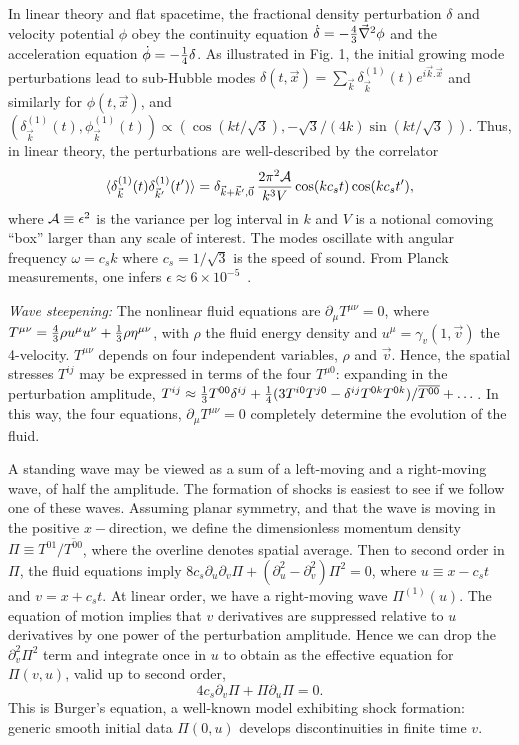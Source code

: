 \documentclass[prl,aps,10pt,twocolumn,showkeys,nofootinbib]{revtex4-1}
\def\ben{\begin{equation}}
\def\een{\end{equation}}
\def\be{\begin{equation}}
\def\ee{\end{equation}}
\begin{document}
In linear theory and flat spacetime, the fractional density perturbation $\delta$ and velocity potential $\phi$ obey the continuity equation $\dot{\delta}=-{4\over 3} \vec{\nabla}^2 \phi$ and the acceleration equation $\dot{\phi}=-{1\over 4} \delta$. As illustrated in Fig. 1, the initial growing mode perturbations lead to sub-Hubble modes $\delta(t,\vec{x})=\sum_{\vec{k}} \delta^{(1)}_{\vec{k}} (t) e^{i\vec{k}.\vec{x}}$  and similarly for $\phi(t,\vec{x})$, and $ ( \delta^{(1)}_{\vec{k}} (t) ,  \phi^{(1)}_{\vec{k}} (t) )\propto \left(\cos (k t/\sqrt{3}),-\sqrt{3}/(4 k)\sin (k t/\sqrt{3})\right).$ Thus, in linear theory, the perturbations are well-described by the correlator
\ben
\langle\delta^{(1)}_{\vec{k}}(t)\delta^{(1)}_{\vec{k}'}(t') \rangle=\delta_{\vec{k}+\vec{k}',\vec{0}}\,{2 \pi^2{ \cal A}\over k^3 V} \cos(k c_s t) \cos(k c_s t'),
\label{eq1}
\een
where ${\cal A}\equiv \epsilon^2$ is the variance per log interval in $k$ and $V$ is a notional comoving ``box'' larger than any scale of interest. The modes oscillate with angular frequency $\omega=c_s k$ where $c_s=1/\sqrt{3}$ is the speed of sound. From Planck measurements, one infers $\epsilon\approx 6\times 10^{-5}$~\cite{foottilt}.

{\it Wave steepening:} 
The nonlinear fluid equations are $\partial_\mu T^{\mu \nu}=0$, where $T^{\mu \nu}={4\over 3} \rho u^\mu u^\nu +{1\over 3} \rho \eta^{\mu \nu}$, with $\rho$ the fluid energy density and $u^\mu=\gamma_{v}(1,\vec{v})$ the 4-velocity.  $T^{\mu \nu}$ depends on four independent variables, $\rho$ and $\vec{v}$. Hence, the spatial stresses $T^{ij}$ may be expressed in terms of the four $T^{\mu 0}$: expanding in the perturbation amplitude, $T^{ij}\approx {1\over 3} T^{00}\delta^{ij} +{1\over 4} (3T^{i 0}T^{j 0}-\delta^{ij} T^{0k} T^{0k})/\overline{T^{00}}+\dots$. In this way, the four equations, $\partial_\mu T^{\mu \nu}=0$ completely determine the evolution of the fluid. 

A standing wave may be viewed as a sum of a left-moving and a right-moving wave, of half the amplitude. The formation of shocks is easiest to see if we follow one of these waves. Assuming planar symmetry, and that the wave is  moving in the positive $x-$direction, we define the dimensionless momentum density $\Pi\equiv T^{01}/\overline{T^{00}}$, where the overline denotes spatial average. Then to second order in $\Pi$, the fluid equations imply $8 c_s \partial_u \partial_v \Pi +(\partial_u^2-\partial_v^2)\Pi^2=0$, where $u\equiv x-c_s t$ and $v=x+c_s t$. At linear order, we have a right-moving wave $\Pi^{(1)}(u)$. The equation of motion implies that $v$ derivatives are suppressed relative to $u$ derivatives by one power of the perturbation amplitude. Hence we can drop the $\partial_v^2\Pi^2$ term and integrate once in $u$ to obtain as the effective equation for $\Pi(v,u)$, valid up to second order,
\be
4 c_s
\partial_v \Pi + \Pi \partial_u \Pi=0.
\label{eq2}
\ee
This is Burger's equation, a well-known model exhibiting shock formation: generic smooth initial data $\Pi(0,u)$ develops discontinuities in finite time $v$. 
\end{document}
